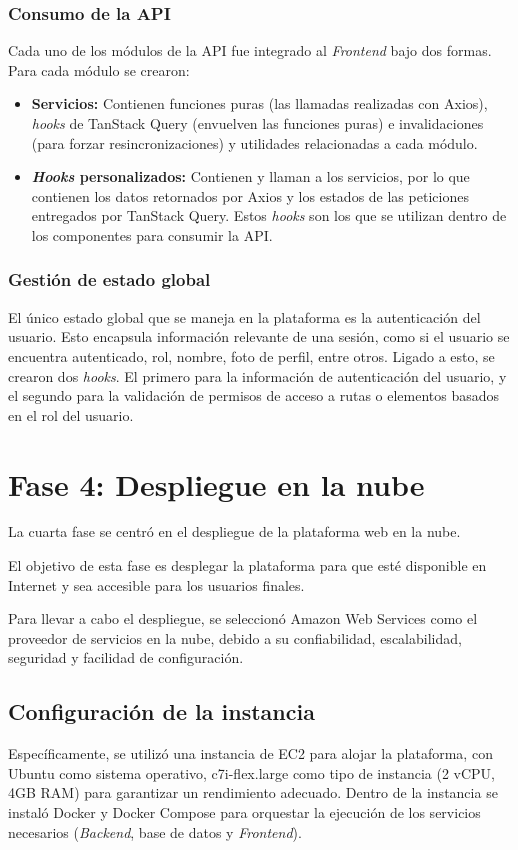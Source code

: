\subsubsection{Consumo de la API}
Cada uno de los módulos de la API fue integrado al \textit{Frontend} bajo dos formas. Para cada módulo se crearon:
\begin{itemize}
    \item \textbf{Servicios:} Contienen funciones puras (las llamadas realizadas con Axios), \textit{hooks} de TanStack Query
    (envuelven las funciones puras) e invalidaciones (para forzar resincronizaciones) y utilidades relacionadas a cada módulo.
    \item \textbf{\textit{Hooks} personalizados:} Contienen y llaman a los servicios, por lo que contienen los datos retornados por Axios
    y los estados de las peticiones entregados por TanStack Query. Estos \textit{hooks} son los que se utilizan dentro de los
    componentes para consumir la API.
\end{itemize}

\subsubsection{Gestión de estado global}
El único estado global que se maneja en la plataforma es la autenticación del usuario. Esto encapsula información relevante de una
sesión, como si el usuario se encuentra autenticado, rol, nombre, foto de perfil, entre otros. Ligado a esto, se crearon dos
\textit{hooks}. El primero para la información de autenticación del usuario, y el segundo para la validación de permisos de acceso
a rutas o elementos basados en el rol del usuario. 

\section{Fase 4: Despliegue en la nube}
La cuarta fase se centró en el despliegue de la plataforma web en la nube.

El objetivo de esta fase es desplegar la plataforma para que esté disponible en Internet y sea accesible para los usuarios finales.

Para llevar a cabo el despliegue, se seleccionó Amazon Web Services como el proveedor de servicios en la nube, debido a su confiabilidad,
escalabilidad, seguridad y facilidad de configuración. 

\subsection{Configuración de la instancia}
Específicamente, se utilizó una instancia de EC2 para alojar la plataforma, con Ubuntu como sistema operativo, c7i-flex.large como tipo
de instancia (2 vCPU, 4GB RAM) para garantizar un rendimiento adecuado.
Dentro de la instancia se instaló Docker y Docker Compose para orquestar la ejecución de los servicios necesarios (\textit{Backend},
base de datos y \textit{Frontend}).

